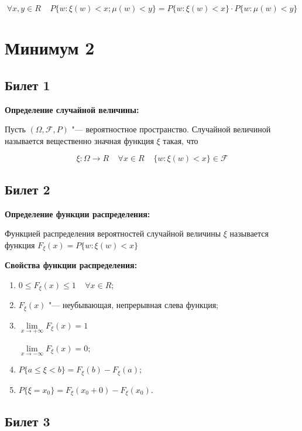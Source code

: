     \[ 
        \forall x, y \in R \;\;\;\; P\{w : \xi(w)
        < x; \mu (w) < y\} = P\{w: \xi (w) < x\} \cdot
        P\{w : \mu (w) < y\}
    \]

\section{Минимум 2}

\subsection{Билет 1}

\textbf{Определение случайной величины:}
\smallskip

Пусть $(\Omega, \mathcal{F}, P)$ "---
вероятностное пространство. Случайной 
величиной называется вещественно значная
функция $\xi$ такая, что

\[
    \xi : \Omega \rightarrow R \;\;\;\;
    \forall x \in R \;\;\;\; \{w: \xi(w) < x\}
    \in \mathcal{F}
\]
\bigskip

\subsection{Билет 2}

\textbf{Определение функции распределения:}
\smallskip

Функцией распределения вероятностей 
случайной величины $\xi$ называется функция 
$F_{\xi}(x) = P\{w : \xi (w) < x\}$
\bigskip

\textbf{Свойства функции распределения:}
\smallskip

\begin{enumerate}
    \item{$0 \leq F_{\xi}(x) \leq 1 \;\;\;\;
    \forall x \in R$;}
    \item{$F_{\xi}(x)$ "--- неубывающая,
    непрерывная слева функция;}
    \item{$\lim\limits_{x \to +\infty} F_{\xi} (x) = 1$
    
    $\lim\limits_{x \to -\infty} F_{\xi} (x) = 0$;}
    \item{$P\{a \leq \xi < b\} = F_{\xi}(b) -
    F_{\xi}(a)$;}
    \item{$P\{\xi = x_0\} = F_{\xi}(x_0 + 0)
    - F_{\xi}(x_0)$.}
\end{enumerate}
\bigskip  

\subsection{Билет 3}


